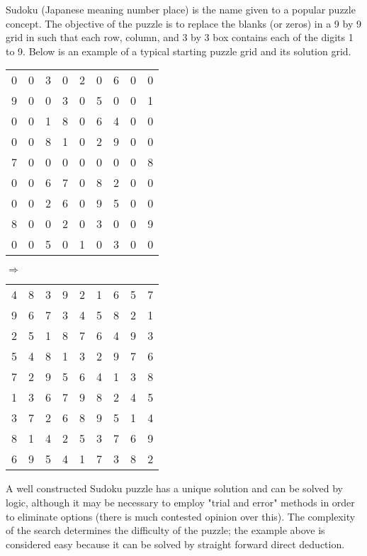 




Sudoku (Japanese meaning number place) is the name given to a popular puzzle concept. The objective of the puzzle is to replace the blanks (or zeros) in a 9 by 9 grid in such that each row, column, and 3 by 3 box contains each of the digits 1 to 9. Below is an example of a typical starting puzzle grid and its solution grid.

\begin{center}
\begin{tabular}{| c c c | c c c | c c c |}
\hline
0 & 0 & 3 & 0 & 2 & 0 & 6 & 0 & 0 \\
9 & 0 & 0 & 3 & 0 & 5 & 0 & 0 & 1 \\
0 & 0 & 1 & 8 & 0 & 6 & 4 & 0 & 0 \\
\hline
0 & 0 & 8 & 1 & 0 & 2 & 9 & 0 & 0 \\
7 & 0 & 0 & 0 & 0 & 0 & 0 & 0 & 8 \\
0 & 0 & 6 & 7 & 0 & 8 & 2 & 0 & 0 \\
\hline
0 & 0 & 2 & 6 & 0 & 9 & 5 & 0 & 0 \\
8 & 0 & 0 & 2 & 0 & 3 & 0 & 0 & 9 \\
0 & 0 & 5 & 0 & 1 & 0 & 3 & 0 & 0 \\
\hline
\end{tabular} $\Rightarrow$
\begin{tabular}{| c c c | c c c | c c c |}
\hline
4 & 8 & 3 & 9 & 2 & 1 & 6 & 5 & 7 \\
9 & 6 & 7 & 3 & 4 & 5 & 8 & 2 & 1 \\
2 & 5 & 1 & 8 & 7 & 6 & 4 & 9 & 3 \\
\hline
5 & 4 & 8 & 1 & 3 & 2 & 9 & 7 & 6 \\
7 & 2 & 9 & 5 & 6 & 4 & 1 & 3 & 8 \\
1 & 3 & 6 & 7 & 9 & 8 & 2 & 4 & 5 \\
\hline
3 & 7 & 2 & 6 & 8 & 9 & 5 & 1 & 4 \\
8 & 1 & 4 & 2 & 5 & 3 & 7 & 6 & 9 \\
6 & 9 & 5 & 4 & 1 & 7 & 3 & 8 & 2 \\
\hline
\end{tabular}
\end{center}

A well constructed Sudoku puzzle has a unique solution and can be solved by logic, although it may be necessary to employ "trial and error" methods in order to eliminate options (there is much contested opinion over this). The complexity of the search determines the difficulty of the puzzle; the example above is considered easy because it can be solved by straight forward direct deduction.


